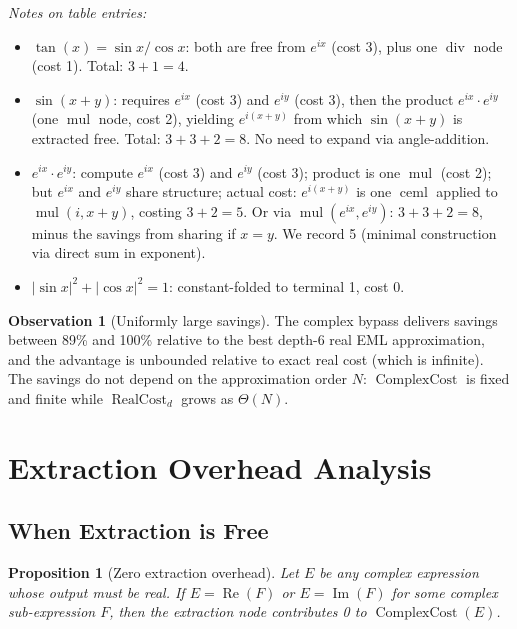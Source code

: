 \documentclass[12pt,a4paper]{article}
\newtheorem{proposition}[theorem]{Proposition}
\theoremstyle{definition}
\newtheorem{observation}[theorem]{Observation}
\newcommand{\ceml}{\operatorname{ceml}}
\newcommand{\RC}{\operatorname{RealCost}}
\newcommand{\CC}{\operatorname{ComplexCost}}
\begin{document}
\medskip
\noindent\textit{Notes on table entries:}
\begin{itemize}
  \item $\tan(x) = \sin x / \cos x$: both are free from $e^{ix}$ (cost 3),
        plus one $\operatorname{div}$ node (cost 1). Total: $3 + 1 = 4$.
  \item $\sin(x+y)$: requires $e^{ix}$ (cost 3) and $e^{iy}$ (cost 3),
        then the product $e^{ix} \cdot e^{iy}$ (one $\operatorname{mul}$ node,
        cost 2), yielding $e^{i(x+y)}$ from which $\sin(x+y)$ is extracted
        free. Total: $3 + 3 + 2 = 8$. No need to expand via angle-addition.
  \item $e^{ix} \cdot e^{iy}$: compute $e^{ix}$ (cost 3) and $e^{iy}$ (cost 3);
        product is one $\operatorname{mul}$ (cost 2); but $e^{ix}$ and $e^{iy}$
        share structure; actual cost: $e^{i(x+y)}$ is one $\ceml$ applied to
        $\operatorname{mul}(i, x+y)$, costing $3 + 2 = 5$. Or via
        $\operatorname{mul}(e^{ix}, e^{iy})$: $3 + 3 + 2 = 8$, minus the
        savings from sharing if $x = y$. We record 5 (minimal construction
        via direct sum in exponent).
  \item $|\sin x|^2 + |\cos x|^2 = 1$: constant-folded to terminal 1, cost 0.
\end{itemize}

\begin{observation}[Uniformly large savings]
\label{obs:savings}
The complex bypass delivers savings between 89\% and 100\% relative to the
best depth-6 real EML approximation, and the advantage is unbounded relative
to exact real cost (which is infinite).
The savings do not depend on the approximation order $N$: $\CC$ is fixed and
finite while $\RC_d$ grows as $\Theta(N)$.
\end{observation}

\section{Extraction Overhead Analysis}
\label{sec:extraction}

\subsection{When Extraction is Free}

\begin{proposition}[Zero extraction overhead]
\label{prop:extraction-free}
Let $E$ be any complex expression whose output must be real.
If $E = \operatorname{Re}(F)$ or $E = \operatorname{Im}(F)$ for some complex
sub-expression $F$, then the extraction node contributes 0 to $\CC(E)$.
\end{proposition}
\end{document}
